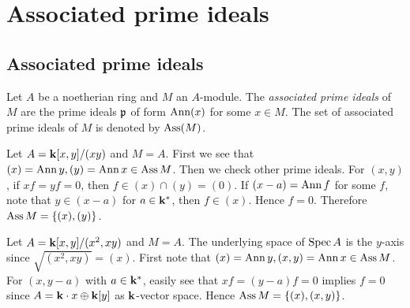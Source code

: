 \section{Associated prime ideals}


\subsection{Associated prime ideals}

    \begin{definition}\label{def: associated prime ideals}
        Let $A$ be a noetherian ring and $M$ an $A$-module.
        The \textit{associated prime ideals} of $M$ are the prime ideals ${\mathfrak{p}}$ of form $\operatorname{Ann}(x)$ for some $x \in M$.
        The set of associated prime ideals of $M$ is denoted by $\operatorname{Ass}(M)$.
    \end{definition}

    \begin{example}
        Let $A = {\mathbf{k}}[x,y]/(xy)$ and $M = A$.
        First we see that $(x) = \operatorname{Ann} y, (y) = \operatorname{Ann} x \in \operatorname{Ass} M$.
        Then we check other prime ideals.
        For $(x,y)$, if $xf = yf = 0$, then $f \in (x) \cap (y) = (0)$.
        If $(x-a) = \operatorname{Ann} f$ for some $f$, note that $y \in (x-a)$ for $a \in {\mathbf{k}}^*$, then $f \in (x)$.
        Hence $f = 0$. 
        Therefore $\operatorname{Ass} M = \{ (x), (y) \}$.
    \end{example}

    \begin{example}
        Let $A = {\mathbf{k}}[x,y]/(x^2, xy)$ and $M = A$.
        The underlying space of $\operatorname{Spec} A$ is the $y$-axis since $\sqrt{(x^2,xy)} = (x)$.
        First note that $(x) = \operatorname{Ann} y, (x,y) = \operatorname{Ann} x \in \operatorname{Ass} M$.
        For $(x,y-a)$ with $a \in {\mathbf{k}}^*$, easily see that $xf = (y-a)f = 0$ implies $f=0$ since $A = {\mathbf{k}} \cdot x \oplus {\mathbf{k}}[y]$ as ${\mathbf{k}}$-vector space.
        Hence $\operatorname{Ass} M = \{ (x), (x,y) \}$.
    \end{example}

    


